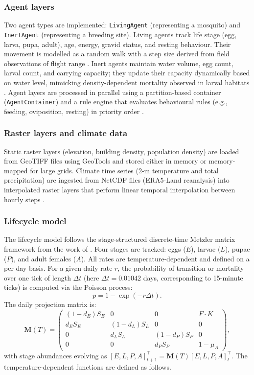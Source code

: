 \documentclass{article}
\begin{document}
\subsubsection{Agent layers}
Two agent types are implemented: \texttt{LivingAgent} (representing a mosquito) and \texttt{InertAgent} (representing a 
breeding site). Living agents track life stage (egg, larva, pupa, adult), age, energy, gravid status, and resting behaviour.
Their movement is modelled as a random walk with a step size derived from field observations of flight range \citep{1966.MA.FRL}. 
Inert agents maintain water volume, egg count, larval count, and carrying capacity; they update their capacity dynamically based on 
water level, mimicking density-dependent mortality observed in larval habitats \citep{2016.ST.OTI}. Agent layers are processed in 
parallel using a partition-based container (\texttt{AgentContainer}) and a rule engine that evaluates behavioural rules (e.g., 
feeding, oviposition, resting) in priority order \citep{2023.ST.ASR}.

\subsubsection{Raster layers and climate data}
Static raster layers (elevation, building density, population density) are loaded from GeoTIFF files using GeoTools and stored either 
in memory or memory-mapped for large grids. Climate time series (2-m temperature and total precipitation) are 
ingested from NetCDF files (ERA5-Land reanalysis) into interpolated raster layers that perform linear temporal interpolation between 
hourly steps \citep{2014.GC.AED, 2017.CL.IMS}.

\subsubsection{Lifecycle model}
\label{sec:lifecycle}

The lifecycle model follows the stage-structured discrete-time Metzler matrix framework from the work of \citet{2025.KM.WTR}. 
Four stages are tracked: eggs ($E$), larvae ($L$), pupae ($P$), and adult females ($A$). All rates are temperature-dependent 
and defined on a per-day basis. For a given daily rate $r$, the probability of transition or mortality over one tick of 
length $\Delta t$ (here $\Delta t = 0.01042$ days, corresponding to 15-minute ticks) is computed via the Poisson process:
\[
p = 1 - \exp(-r \Delta t).
\]
The daily projection matrix is:
\[
\mathbf{M}(T) = 
\begin{pmatrix}
(1 - d_E) S_E & 0 & 0 & F \cdot K \\
d_E S_E & (1 - d_L) S_L & 0 & 0 \\
0 & d_L S_L & (1 - d_P) S_P & 0 \\
0 & 0 & d_P S_P & 1 - \mu_A
\end{pmatrix},
\]
with stage abundances evolving as $[E, L, P, A]_{t+1}^\top = \mathbf{M}(T) [E, L, P, A]_t^\top$. The temperature-dependent 
functions are defined as follows.
\end{document}
